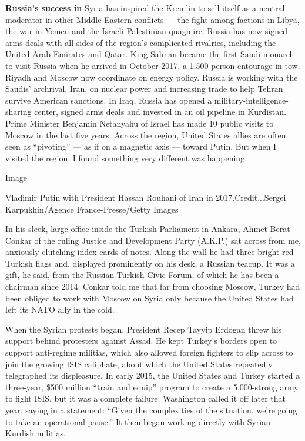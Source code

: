 \textbf{Russia's success in} Syria has inspired the Kremlin to sell
itself as a neutral moderator in other Middle Eastern conflicts --- the
fight among factions in Libya, the war in Yemen and the
Israeli-Palestinian quagmire. Russia has now signed arms deals with all
sides of the region's complicated rivalries, including the United Arab
Emirates and Qatar. King Salman became the first Saudi monarch to visit
Russia when he arrived in October 2017, a 1,500-person entourage in tow.
Riyadh and Moscow now coordinate on energy policy. Russia is working
with the Saudis' archrival, Iran, on nuclear power and increasing trade
to help Tehran survive American sanctions. In Iraq, Russia has opened a
military-intelligence-sharing center, signed arms deals and invested in
an oil pipeline in Kurdistan. Prime Minister Benjamin Netanyahu of
Israel has made 10 public visits to Moscow in the last five years.
Across the region, United States allies are often seen as ``pivoting''
--- as if on a magnetic axis --- toward Putin. But when I visited the
region, I found something very different was happening.

Image

Vladimir Putin with President Hassan Rouhani of Iran in
2017.Credit...Sergei Karpukhin/Agence France-Presse/Getty Images

In his sleek, large office inside the Turkish Parliament in Ankara,
Ahmet Berat Conkar of the ruling Justice and Development Party (A.K.P.)
sat across from me, anxiously clutching index cards of notes. Along the
wall he had three bright red Turkish flags and, displayed prominently on
his desk, a Russian teacup. It was a gift, he said, from the
Russian-Turkish Civic Forum, of which he has been a chairman since 2014.
Conkar told me that far from choosing Moscow, Turkey had been obliged to
work with Moscow on Syria only because the United States had left its
NATO ally in the cold.

When the Syrian protests began, President Recep Tayyip Erdogan threw his
support behind protesters against Assad. He kept Turkey's borders open
to support anti-regime militias, which also allowed foreign fighters to
slip across to join the growing ISIS caliphate, about which the United
States repeatedly telegraphed its displeasure. In early 2015, the United
States and Turkey started a three-year, \$500 million ``train and
equip'' program to create a 5,000-strong army to fight ISIS, but it was
a complete failure. Washington called it off later that year, saying in
a statement: ``Given the complexities of the situation, we're going to
take an operational pause.'' It then began working directly with Syrian
Kurdish militias.

